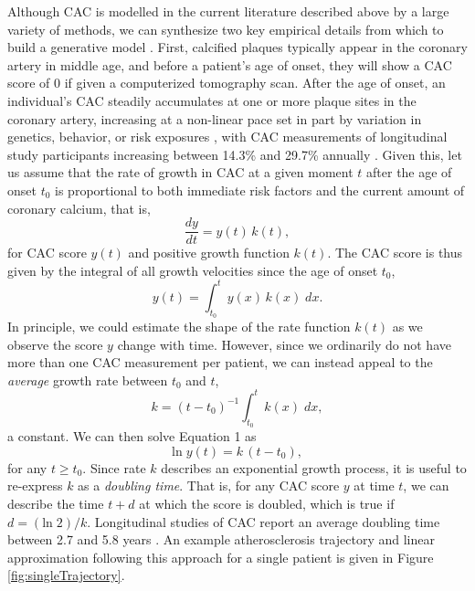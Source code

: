 \documentclass[aps,pre,twocolumn,twoside,tightenlines,groupedaddress,amsmath,amssymb,nobibnotes,final,showkeys,letterpaper]{revtex4-2}
\begin{document}
Although CAC is modelled in the current literature described above by a large variety of methods, we can synthesize two key empirical details from which to build a generative model \cite{gelman2021regression}. First, calcified plaques typically appear in the coronary artery in middle age, and before a patient's age of onset, they will show a CAC score of 0 if given a computerized tomography scan. After the age of onset, an individual's CAC steadily accumulates at one or more plaque sites in the coronary artery, increasing at a non-linear pace set in part by variation in genetics, behavior, or risk exposures \cite{taylor2005premature, budoff2009absolute, mcclelland2009arterial, budoff2013progression}, with CAC measurements of longitudinal study participants increasing between 14.3\% and 29.7\% annually \cite{houslay2006progressive, ikegami2018rate}. Given this, let us assume that the rate of growth in CAC at a given moment $t$ after the age of onset $t_0$ is proportional to both immediate risk factors and the current amount of coronary calcium, that is,
\begin{equation}
  \label{eq:model}
  \frac{dy}{dt} = y(t)\,k(t),
\end{equation}
for CAC score $y(t)$ and positive growth function $k(t)$. The CAC score is thus given by the integral of all growth velocities since the age of onset $t_0$,
\begin{equation}
  \label{eq:modelIntegral}
  y(t) = \int_{t_0}^{t} y(x)\,k(x)\;dx.
\end{equation}
In principle, we could estimate the shape of the rate function $k(t)$ as we observe the score $y$ change with time. However, since we ordinarily do not have more than one CAC measurement per patient, we can instead appeal to the \textit{average} growth rate between $t_0$ and $t$, 
$$
k = (t - t_0)^{-1}\int_{t_0}^{t} k(x)\;dx,
$$
a constant. We can then solve Equation 1 as
\begin{equation}
  \label{eq:modelSolution}
  \mathrm{ln}\;y(t) = k\,(t - t_0),
\end{equation}
for any $t \geq t_0$. Since rate $k$ describes an exponential growth process, it is useful to re-express $k$ as a \textit{doubling time}. That is, for any CAC score $y$ at time $t$, we can describe the time $t + d$ at which the score is doubled, which is true if $d = (\mathrm{ln}\;2)/k$. Longitudinal studies of CAC report an average doubling time between 2.7 and 5.8 years \cite{houslay2006progressive, ikegami2018rate}. An example atherosclerosis trajectory and linear approximation following this approach for a single patient is given in Figure \ref{fig:singleTrajectory}.
\end{document}
